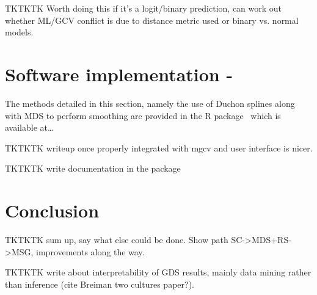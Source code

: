 TKTKTK Worth doing this if it's a logit/binary prediction, can work out whether ML/GCV conflict is due to distance metric used or binary vs. normal models.

\section{Software implementation - \mdspack}

The methods detailed in this section, namely the use of Duchon splines along with MDS to perform smoothing are provided in the \textsf{R} package \mdspack\ which is available at\ldots

TKTKTK writeup once properly integrated with mgcv and user interface is nicer.

TKTKTK write documentation in the package


\section{Conclusion}

TKTKTK sum up, say what else could be done. Show path SC->MDS+RS->MSG, improvements along the way.

TKTKTK write about interpretability of GDS results, mainly data mining rather than inference (cite Breiman two cultures paper?).

